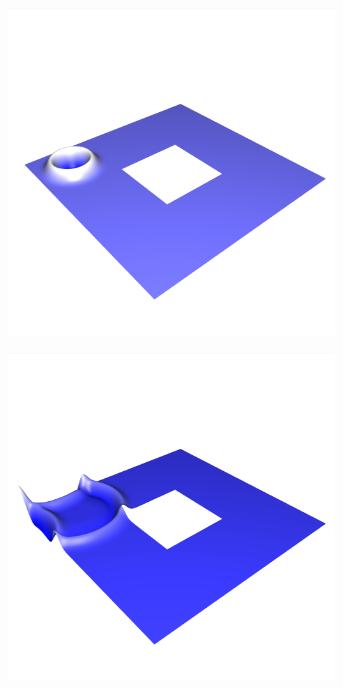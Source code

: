 \documentclass[crop=false,10pt,ngerman]{standalone}
\begin{document}
\begin{figure}[h]
\begin{subfigure}[b]{0.24\textwidth}
          \includegraphics[trim={0.9cm 1.8cm 0.5cm 5cm},clip,width=0.95\textwidth]{images/ring_wave_1.png}
          \caption{}
        \end{subfigure}
        \begin{subfigure}[b]{0.24\textwidth}
          \center
          \includegraphics[trim={0.9cm 1.8cm 0.5cm 5cm},clip,width=0.95\textwidth]{images/ring_wave_2.png}

\end{subfigure}
\end{figure}
\end{document}
